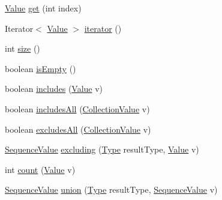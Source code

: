 \begin{DoxyCompactItemize}
\hyperlink{classorg_1_1tzi_1_1use_1_1uml_1_1ocl_1_1value_1_1_value}{Value} \hyperlink{classorg_1_1tzi_1_1use_1_1uml_1_1ocl_1_1value_1_1_sequence_value_aab6e84179e61923359adce2997d7f04e}{get} (int index)
\item 
Iterator$<$ \hyperlink{classorg_1_1tzi_1_1use_1_1uml_1_1ocl_1_1value_1_1_value}{Value} $>$ \hyperlink{classorg_1_1tzi_1_1use_1_1uml_1_1ocl_1_1value_1_1_sequence_value_a2e776c0e1d5221359651f1f867479e97}{iterator} ()
\item 
int \hyperlink{classorg_1_1tzi_1_1use_1_1uml_1_1ocl_1_1value_1_1_sequence_value_a0b908950938146f862681b07bdc5a1d9}{size} ()
\item 
boolean \hyperlink{classorg_1_1tzi_1_1use_1_1uml_1_1ocl_1_1value_1_1_sequence_value_aefe6be359bec57c1d414f93bd6e74f91}{is\-Empty} ()
\item 
boolean \hyperlink{classorg_1_1tzi_1_1use_1_1uml_1_1ocl_1_1value_1_1_sequence_value_adc62c1a71aab5bc5b3e44f808855dbf7}{includes} (\hyperlink{classorg_1_1tzi_1_1use_1_1uml_1_1ocl_1_1value_1_1_value}{Value} v)
\item 
boolean \hyperlink{classorg_1_1tzi_1_1use_1_1uml_1_1ocl_1_1value_1_1_sequence_value_a7400062469c839a6ea4a967b043918f2}{includes\-All} (\hyperlink{classorg_1_1tzi_1_1use_1_1uml_1_1ocl_1_1value_1_1_collection_value}{Collection\-Value} v)
\item 
boolean \hyperlink{classorg_1_1tzi_1_1use_1_1uml_1_1ocl_1_1value_1_1_sequence_value_a0b7b63c169393b5215ecd4e9f36bf3c5}{excludes\-All} (\hyperlink{classorg_1_1tzi_1_1use_1_1uml_1_1ocl_1_1value_1_1_collection_value}{Collection\-Value} v)
\item 
\hyperlink{classorg_1_1tzi_1_1use_1_1uml_1_1ocl_1_1value_1_1_sequence_value}{Sequence\-Value} \hyperlink{classorg_1_1tzi_1_1use_1_1uml_1_1ocl_1_1value_1_1_sequence_value_a1286c82fec9226e13bd993ff469fc5e4}{excluding} (\hyperlink{interfaceorg_1_1tzi_1_1use_1_1uml_1_1ocl_1_1type_1_1_type}{Type} result\-Type, \hyperlink{classorg_1_1tzi_1_1use_1_1uml_1_1ocl_1_1value_1_1_value}{Value} v)
\item 
int \hyperlink{classorg_1_1tzi_1_1use_1_1uml_1_1ocl_1_1value_1_1_sequence_value_a1a97175456cb0f65d7f0e421b1c2d4db}{count} (\hyperlink{classorg_1_1tzi_1_1use_1_1uml_1_1ocl_1_1value_1_1_value}{Value} v)
\item 
\hyperlink{classorg_1_1tzi_1_1use_1_1uml_1_1ocl_1_1value_1_1_sequence_value}{Sequence\-Value} \hyperlink{classorg_1_1tzi_1_1use_1_1uml_1_1ocl_1_1value_1_1_sequence_value_a6b016b7ee08cf61b388ce56c9fd12cab}{union} (\hyperlink{interfaceorg_1_1tzi_1_1use_1_1uml_1_1ocl_1_1type_1_1_type}{Type} result\-Type, \hyperlink{classorg_1_1tzi_1_1use_1_1uml_1_1ocl_1_1value_1_1_sequence_value}{Sequence\-Value} v)

\end{DoxyCompactItemize}
